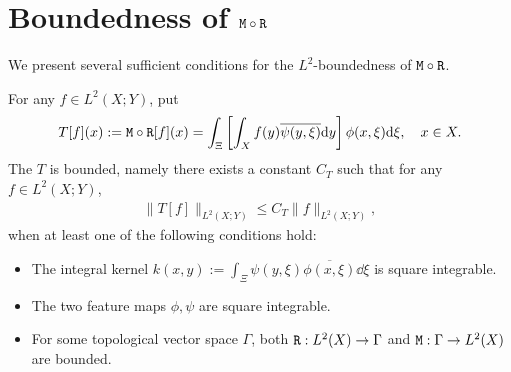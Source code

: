 \section{Boundedness of $\mathtt{M} \circ \mathtt{R}$} \label{sec:bddness}
We present several sufficient conditions for the $L^2$-boundedness of $\mathtt{M} \circ \mathtt{R}$.

\begin{lemma}
For any $f \in L^2(X;Y)$, put
\begin{align*}
T[f](x) := \mathtt{M} \circ \mathtt{R} [f](x) = \int_\Xi \left[ \int_X f(y) \overline{\psi(y,\xi)} \mathrm{d} y \right] \phi(x,\xi) \mathrm{d} \xi, \quad x \in X.
\end{align*}
The $T$ is bounded, namely there exists a constant $C_T$ such that for any $f \in L^2(X;Y)$,
\begin{align*}
    \| T[f] \|_{L^2(X;Y)} \le C_T \| f \|_{L^2(X;Y)},
\end{align*}
when at least one of the following conditions hold:
\begin{itemize}
    \item[T1.] The integral kernel $k(x,y) := \int_\Xi \psi(y,\xi) \overline{\phi(x,\xi)} \dd \xi$ is square integrable.
    \item[T2.] The two feature maps $\phi,\psi$ are square integrable.
    \item[T3.] For some topological vector space $\Gamma$, both $\mathtt{R} : L^2(X) \to \Gamma$ and $\mathtt{M} : \Gamma \to L^2(X)$ are bounded.
\end{itemize}
\end{lemma}

